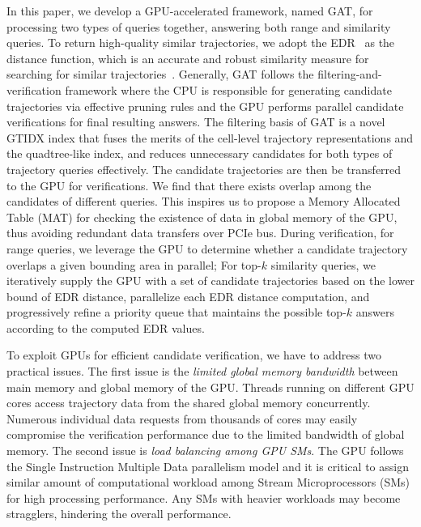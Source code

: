 \documentclass[10pt,conference,letterpaper]{IEEEtran}
\newcommand{\frname}{GAT\xspace }
\newcommand{\idxname}{GTIDX\xspace }
\begin{document}
In this paper, we develop a GPU-accelerated framework, named \frname, for processing two types of queries together, answering both range and similarity queries.
To return high-quality similar trajectories, we adopt the EDR~\cite{DBLP:conf/sigmod/ChenOO05} as the distance function, which is an accurate and robust similarity measure for searching for similar trajectories~\cite{EDWP15}.
Generally, \frname follows the filtering-and-verification framework where the CPU is responsible for generating candidate trajectories via effective pruning rules and the GPU performs parallel candidate verifications for final resulting answers.
The filtering basis of \frname is a novel \idxname index that fuses the merits of the cell-level trajectory representations and the quadtree-like index, and reduces unnecessary candidates for both types of trajectory queries effectively.
The candidate trajectories are then be transferred to the GPU for verifications. We find that there exists overlap among the candidates of different queries. This inspires us to propose a Memory Allocated Table (MAT) for checking the existence of data in global memory of the GPU, thus avoiding redundant data transfers over PCIe bus.
During verification, for range queries, we leverage the GPU to determine whether a candidate trajectory overlaps a given bounding area in parallel; For top-$k$ similarity queries, we iteratively supply the GPU with a set of candidate trajectories based on the lower bound of EDR distance, parallelize each EDR distance computation, and progressively refine a priority queue that maintains the possible top-$k$ answers according to the computed EDR values.

To exploit GPUs for efficient candidate verification, we have to address two practical issues.
The first issue is the \emph{limited global memory bandwidth} between main memory and global memory of the GPU.
Threads running on different GPU cores access trajectory data from the shared global memory concurrently. Numerous individual data requests from thousands of cores may easily compromise the verification performance due to the limited bandwidth of global memory.
The second issue is \emph{load balancing among GPU SMs}. The GPU follows the Single Instruction Multiple Data parallelism model and it is critical to assign similar amount of computational workload among Stream Microprocessors (SMs) for high processing performance. Any SMs with heavier workloads may become stragglers, hindering the overall performance.
\end{document}
